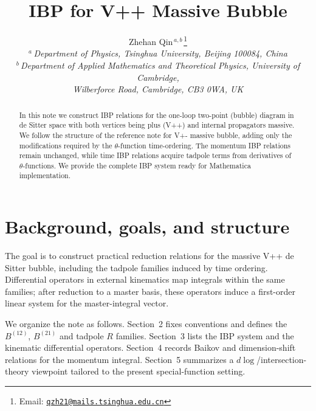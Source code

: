 \documentclass[a4paper,12pt]{article}
\newcommand{\fnemail}[1]{\footnote{Email: \href{mailto:#1}{\nolinkurl{#1}}}}
\begin{document}
\title{\Large\textbf{IBP for V++ Massive Bubble\\[2mm]}}

\author{Zhehan Qin$^{\,a,b\,}$\fnemail{qzh21@mails.tsinghua.edu.cn}\\[5mm]
	$^a\,$\normalsize{\emph{Department of Physics, Tsinghua University, Beijing 100084, China} }\\
	$^b\,$\normalsize{\emph{Department of Applied Mathematics and Theoretical Physics, University of Cambridge,}}\\\normalsize{\emph{Wilberforce Road, Cambridge, CB3 0WA, UK}}\\
}

\date{}
\maketitle

\vspace{20mm}

\begin{abstract}
In this note we construct IBP relations for the one-loop two-point (bubble) diagram in de Sitter space with both vertices being plus (V++) and internal propagators massive. We follow the structure of the reference note for V+- massive bubble, adding only the modifications required by the $\theta$-function time-ordering. The momentum IBP relations remain unchanged, while time IBP relations acquire tadpole terms from derivatives of $\theta$-functions. We provide the complete IBP system ready for Mathematica implementation.
	\vspace{10mm}
\end{abstract}

\newpage
\tableofcontents


\section{Background, goals, and structure}
The goal is to construct practical reduction relations for the massive V++ de Sitter bubble, including the tadpole families induced by time ordering. Differential operators in external kinematics map integrals within the same families; after reduction to a master basis, these operators induce a first-order linear system for the master-integral vector.

We organize the note as follows. Section~2 fixes conventions and defines the $B^{(12)}$, $B^{(21)}$ and tadpole $R$ families. Section~3 lists the IBP system and the kinematic differential operators. Section~4 records Baikov and dimension-shift relations for the momentum integral. Section~5 summarizes a $d\log$/intersection-theory viewpoint tailored to the present special-function setting.
\end{document}
